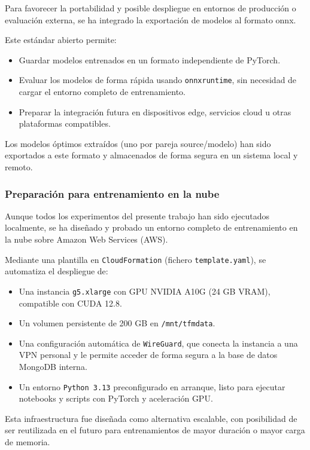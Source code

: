 Para favorecer la portabilidad y posible despliegue en entornos de producción o evaluación externa, se ha integrado la exportación de modelos al formato \gls{onnx}.

Este estándar abierto permite:
\begin{itemize}
	\item Guardar modelos entrenados en un formato independiente de PyTorch.
	\item Evaluar los modelos de forma rápida usando \texttt{onnxruntime}, sin necesidad de cargar el entorno completo de entrenamiento.
	\item Preparar la integración futura en dispositivos edge, servicios cloud u otras plataformas compatibles.
\end{itemize}

Los modelos óptimos extraídos (uno por pareja source/modelo) han sido exportados a este formato y almacenados de forma segura en un sistema local y remoto.

\subsubsection*{Preparación para entrenamiento en la nube}

Aunque todos los experimentos del presente trabajo han sido ejecutados localmente, se ha diseñado y probado un entorno completo de entrenamiento en la nube sobre Amazon Web Services (AWS).

Mediante una plantilla en \texttt{CloudFormation} (fichero \texttt{template.yaml}), se automatiza el despliegue de:

\begin{itemize}
	\item Una instancia \texttt{g5.xlarge} con GPU NVIDIA A10G (24 GB VRAM), compatible con CUDA 12.8.
	\item Un volumen persistente de 200 GB en \texttt{/mnt/tfmdata}.
	\item Una configuración automática de \texttt{WireGuard}, que conecta la instancia a una VPN personal y le permite acceder de forma segura a la base de datos MongoDB interna.
	\item Un entorno \texttt{Python 3.13} preconfigurado en arranque, listo para ejecutar notebooks y scripts con PyTorch y aceleración GPU.
\end{itemize}

Esta infraestructura fue diseñada como alternativa escalable, con posibilidad de ser reutilizada en el futuro para entrenamientos de mayor duración o mayor carga de memoria.

